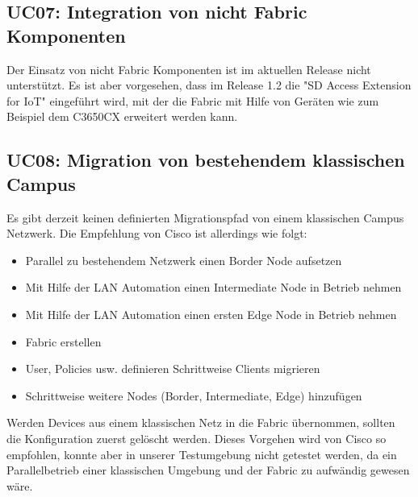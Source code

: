 \begin{landscape}
\subsection{UC07: Integration von nicht Fabric Komponenten}
Der Einsatz von nicht Fabric Komponenten ist im aktuellen Release nicht unterstützt. Es ist aber vorgesehen, dass im Release 1.2 die "SD Access Extension for IoT" eingeführt wird, mit der die Fabric mit Hilfe von Geräten wie zum Beispiel dem C3650CX erweitert werden kann.
\pagebreak

\subsection{UC08: Migration von bestehendem klassischen Campus}
Es gibt derzeit keinen definierten Migrationspfad von einem klassischen Campus Netzwerk. Die Empfehlung von Cisco ist allerdings wie folgt:
\begin{itemize}
	\item Parallel zu bestehendem Netzwerk einen Border Node aufsetzen
	\item Mit Hilfe der LAN Automation einen Intermediate Node in Betrieb nehmen
	\item Mit Hilfe der LAN Automation einen ersten Edge Node in Betrieb nehmen
	\item Fabric erstellen
	\item User, Policies usw. definieren
	\subitem Schrittweise Clients migrieren
	\item Schrittweise weitere Nodes (Border, Intermediate, Edge) hinzufügen
\end{itemize}

Werden Devices aus einem klassischen Netz in die Fabric übernommen, sollten die Konfiguration zuerst gelöscht werden. 
Dieses Vorgehen wird von Cisco so empfohlen, konnte aber in unserer Testumgebung nicht getestet werden, da ein Parallelbetrieb einer klassischen Umgebung und der Fabric zu aufwändig gewesen wäre.
\pagebreak


\end{landscape}

